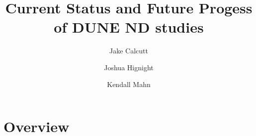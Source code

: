 \documentclass[12pt]{article}
\title{Current Status and Future Progess of DUNE ND studies}
\date{}
\begin{document}
\author[1]{Jake Calcutt}
\author[1]{Joshua Hignight}
\author[1]{Kendall Mahn}


\maketitle
\thispagestyle{fancy}

\section{Overview}\label{sec:view}

\end{document}

